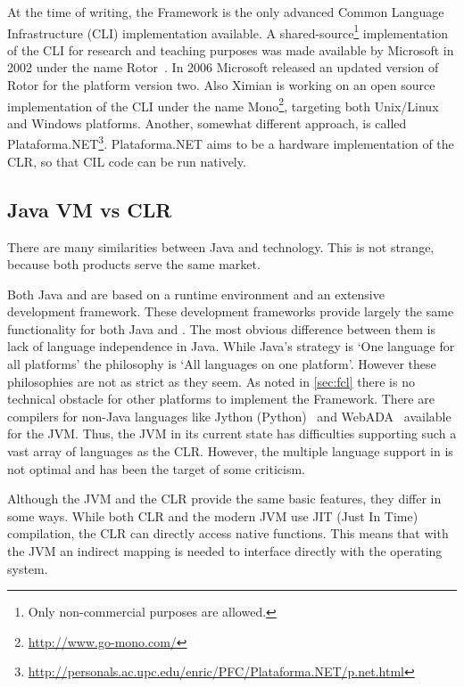 At the time of writing, the \dotNET Framework is the only advanced Common Language Infrastructure (CLI) implementation available.
A shared-source\footnote{Only non-commercial purposes are allowed.} implementation of the CLI for research and teaching purposes was made available by Microsoft in 2002 under the name Rotor~\cite{Stutz02}. In 2006 Microsoft released an updated version of Rotor for the \dotNET platform version two.
Also Ximian is working on an open source implementation of the CLI under the name Mono\footnote{\url{http://www.go-mono.com/}}, targeting both Unix/Linux and Windows platforms.
Another, somewhat different approach, is called Plataforma.NET\footnote{\url{http://personals.ac.upc.edu/enric/PFC/Plataforma.NET/p.net.html}}. Plataforma.NET aims to be a hardware implementation of the CLR, so that CIL code can be run natively.

\subsection{Java VM vs \dotNET CLR}
There are many similarities between Java and \dotNET technology. This is not strange, because both products serve the same market.

Both Java and \dotNET are based on a runtime environment and an extensive development framework.
These development frameworks provide largely the same functionality for both Java and \dotNET.
The most obvious difference between them is lack of language independence in Java.
While Java's strategy is `One language for all platforms' the \dotNET philosophy is `All languages on one platform'.
However these philosophies are not as strict as they seem.
As noted in \autoref{sec:fcl} there is no technical obstacle for other platforms to implement the \dotNET Framework.
There are compilers for non-Java languages like Jython (Python)~\cite{Jython03} and WebADA~\cite{Ada96} available for the JVM.
Thus, the JVM in its current state has difficulties supporting such a vast array of languages as the CLR.
However, the multiple language support in \dotNET is not optimal and has been the target of some criticism.

Although the JVM and the CLR provide the same basic features, they differ in some ways.
While both CLR and the modern JVM use JIT (Just In Time) compilation, the CLR can directly access native functions.
This means that with the JVM an indirect mapping is needed to interface directly with the operating system.